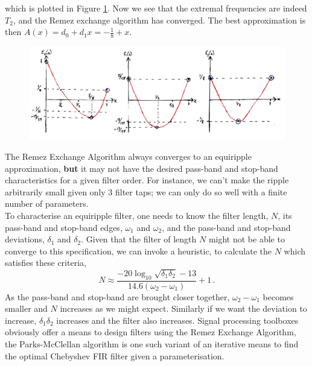 \begin{exmp}
  which is plotted in Figure \ref{fig::lecture_17_remez_iteration}. Now we see that
  the extremal frequencies
  are indeed $T_2$, and the Remez exchange algorithm has converged. The best
  approximation is then $A(x) = d_0 + d_1 x = - \frac{1}{8} + x$.
  \begin{figure}[!htb]
    \includegraphics[width=\textwidth]{images/lecture_17_remez_iteration.JPG}
    \caption{
    }
    \label{fig::lecture_17_remez_iteration}
  \end{figure}

\end{exmp}
%
The Remez Exchange Algorithm always converges to an equiripple approximation,
\textbf{but} it may not have the desired pass-band and stop-band characteristics for
a given filter order. For instance, we can't make the ripple arbitrarily small
given only 3 filter taps; we can only do so well with a finite number of
parameters.\\
%
To characterise an equiripple filter, one needs to know the filter length, $N$,
its pass-band and stop-band edges, $\omega_1$ and $\omega_2$, and the pass-band
and stop-band deviations, $\delta_1$ and $\delta_2$. Given that the filter of
length $N$ might not be able to converge to this specification, we can invoke a
heuristic, to calculate the $N$ which satisfies these criteria,
%
\begin{displaymath}
  N \approx \frac{-20 \log_10\sqrt{\delta_1\delta_2} - 13}{14.6(\omega_2 - \omega_1)} + 1 \,.
\end{displaymath}
%
As the pass-band and stop-band are brought closer together, $\omega_2 - \omega_1$
becomes smaller and $N$ increases as we might expect. Similarly if we want
the deviation to increase, $\delta_1\delta_2$ increases and the
filter also increases. Signal processing toolboxes obviously offer
a means to design filters using the Remez Exchange Algorithm,
the Parks-McClellan algorithm is one such variant of an iterative
means to find the optimal Chebyshev FIR filter given a parameterisation.
%
